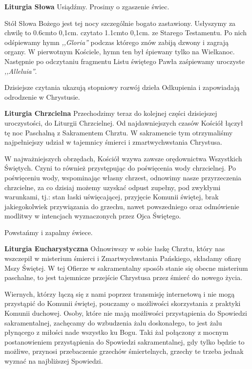 \documentclass[10pt,oneside,final,notitlepage,a4paper,wide]{mwart}
\def\dotfill#1{\cleaders\hbox to #1{.}\hfill}
\newcommand\dotline[2][0,1cm]{\leavevmode\hbox to #2{\dotfill{#1}\hfil}}
\begin{document}
	\textbf{Liturgia Słowa} Usiądźmy. Prosimy o zgaszenie świec.
\par Stół Słowa Bożego jest tej nocy szczególnie bogato zastawiony. Usłyszymy za chwilę \dotline{0.6cm} czyta\dotline{1.1cm} ze Starego Testamentu. Po nich odśpiewamy hymn \emph{,,Gloria''} podczas którego znów zabiją dzwony i zagrają organy. W pierwotnym Kościele, hymn ten był śpiewany tylko na Wielkanoc. Następnie po odczytaniu fragmentu Listu świętego Pawła zaśpiewamy uroczyste \emph{,,Alleluia''}.
\par Dzisiejsze czytania ukazują stopniowy rozwój dzieła Odkupienia i zapowiadają odrodzenie w Chrystusie. \newpage %

	\textbf{Liturgia Chrzcielna} Przechodzimy teraz do kolejnej części dzisiejszej uroczystości, do Liturgii Chrzcielnej. Od najdawniejszych czasów Kościół łączył tę noc Paschalną z Sakramentem Chrztu. W sakramencie tym otrzymaliśmy najpełniejszy udział w tajemnicy śmierci i zmartwychwstania Chrystusa.
\par W najważniejszych obrzędach, Kościół wzywa zawsze orędownictwa Wszystkich Świętych. Czyni to również przystępując do poświęcenia wody chrzcielnej. Po poświęceniu wody, wspominając własny chrzest, odnowimy nasze przyrzeczenia chrzcielne, za co dzisiaj możemy uzyskać odpust zupełny, pod zwykłymi warunkami, tj.: stan łaski uświęcającej, przyjęcie Komunii świętej, brak jakiegokolwiek przywiązania do grzechu, nawet powszedniego oraz odmówienie modlitwy w intencjach wyznaczonych przez Ojca Świętego.
\par Powstańmy i zapalmy świece. \bigskip

	\textbf{Liturgia Eucharystyczna} Odnowiwszy w sobie łaskę Chrztu, który nas wszczepił w misterium śmierci i Zmartwychwstania Pańskiego, składamy ofiarę Mszy Świętej. W tej Ofierze w sakramentalny sposób stanie się obecne misterium paschalne, to jest tajemnicze przejście Chrystusa przez śmierć do nowego życia.
	
	Wiernych, którzy łączą się z nami poprzez transmisję internetową i nie mogą przystąpić do Komunii świętej, pouczamy o możliwości skorzystania z praktyki Komunii duchowej.
	Osoby, które nie mają możliwości przystąpienia do Spowiedzi sakramentalnej, zachęcamy do wzbudzenia żalu doskonałego, to jest żalu płynącego z miłości nade wszystko ku Bogu. Taki żal połączony z mocnym postanowieniem przystąpienia do Spowiedzi sakramentalnej, gdy tylko będzie to możliwe, przynosi przebaczenie grzechów śmiertelnych, grzechy te trzeba jednak wyznać na najbliższej Spowiedzi.
\end{document}
